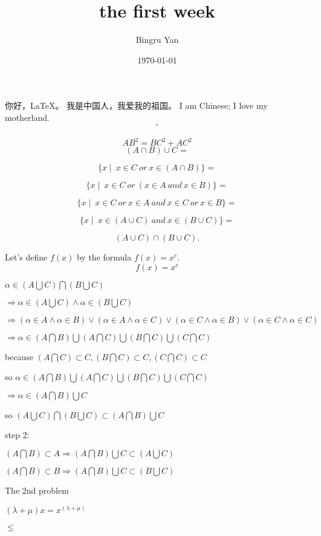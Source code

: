 \documentclass{article}%
\title{\heiti the first week}%
\author{\kaishu Bingru Yan}%
\date{\today}%
\newcommand\degree{^\circ}%
\begin{document}
	\maketitle%
	
	你好，\LaTeX。
	我是中国人，我爱我的祖国。
	I am Chinese; I love my motherland.	
	$$\degree$$
	
	\begin{equation}
		AB^2=BC^2+AC^2
	\end{equation}
	$$(A \cap B) \cup C = $$
	
	$$\{x \mid ~x \in C ~or ~x \in (A \cap B)\} = $$
	
	$$\{x \mid ~x \in C ~or ~(x \in A ~and ~x \in B)\} = $$
	
	$$\{x \mid ~x \in C ~or ~x \in A ~and ~x \in C ~or  ~x \in B\} = $$
	
	$$\{x \mid ~x \in (A \cup C) ~and ~x \in (B \cup C)\} =$$ 
	
	$$(A \cup C) \cap (B \cup C).$$


	Let's define $f(x)$ by the formula $f(x)=x^{e}$.$$f(x)=x^e$$
	
	$ \alpha \in (A\bigcup C)\bigcap (B\bigcup C)$
	
	$\Rightarrow \alpha \in(A\bigcup C) \wedge \alpha \in(B\bigcup C)$
	
	$\Rightarrow (\alpha \in A \wedge \alpha \in B) \vee 
	(\alpha \in A \wedge \alpha \in C) \vee 
	(\alpha \in C \wedge \alpha \in B) \vee 
	(\alpha \in C \wedge \alpha \in C)$
	
	$\Rightarrow \alpha \in (A \bigcap B) \bigcup 
	(A \bigcap C) \bigcup 
	(B \bigcap C) \bigcup 
	(C \bigcap C)$
	
	because $(A \bigcap C) \subset C, (B \bigcap C) \subset C, (C \bigcap C) \subset C$
	
	so $\alpha \in (A \bigcap B) \bigcup 
	(A \bigcap C) \bigcup 
	(B \bigcap C) \bigcup 
	(C \bigcap C)$
	
	
	$\Rightarrow \alpha \in (A \bigcap B) \bigcup C$
	
	so $(A\bigcup C)\bigcap (B\bigcup C) \subset (A \bigcap B) \bigcup C$
	
	step 2:
	
	$(A \bigcap B) \subset A \Rightarrow (A \bigcap B) \bigcup C \subset (A \bigcup C)$

	$(A \bigcap B) \subset B \Rightarrow (A \bigcap B) \bigcup C \subset (B \bigcup C)$
	
	
	
	The 2nd problem
	
	$(\lambda + \mu)x = x^{(\lambda + \mu)}$
	
	$\leq$
\end{document}
